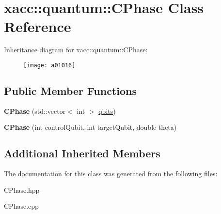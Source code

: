 \hypertarget{a01016}{}\section{xacc\+:\+:quantum\+:\+:C\+Phase Class Reference}
\label{a01016}
Inheritance diagram for xacc\+:\+:quantum\+:\+:C\+Phase\+:\begin{figure}[H]
\begin{center}
\leavevmode
\texttt{[image: a01016]}
\end{center}
\end{figure}
\subsection*{Public Member Functions}
\begin{DoxyCompactItemize}
\item 
\mbox{\label{a01016_a5899f838bc4b892d179f51fcf0ac4cc8}} 
{\bfseries C\+Phase} (std\+::vector$<$ int $>$ \hyperlink{a00992_a2a56be6c2519ea65df4d06f4abae1393}{qbits})
\item 
\mbox{\label{a01016_af642f499455f0065279a1e1d178c818f}} 
{\bfseries C\+Phase} (int control\+Qubit, int target\+Qubit, double theta)
\end{DoxyCompactItemize}
\subsection*{Additional Inherited Members}


The documentation for this class was generated from the following files\+:\begin{DoxyCompactItemize}
\item 
C\+Phase.\+hpp\item 
C\+Phase.\+cpp\end{DoxyCompactItemize}
